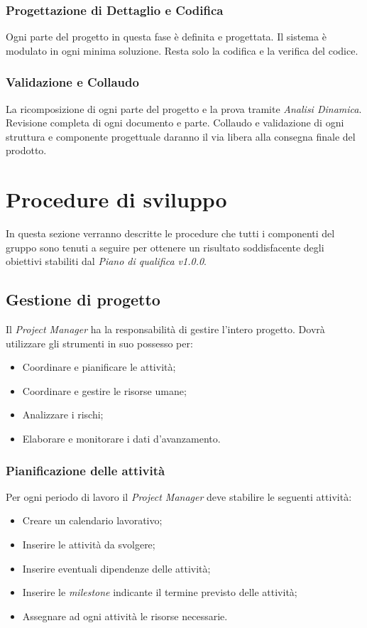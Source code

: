 \documentclass[12pt,a4paper,titlepage]{article}
\begin{document}
\subsubsection{Progettazione di Dettaglio e Codifica}
Ogni parte del progetto in questa fase è definita e progettata. Il sistema è modulato in ogni minima soluzione. Resta solo la codifica e la verifica del codice.

\subsubsection{Validazione e Collaudo}
La ricomposizione di ogni parte del progetto e la prova tramite \textit{Analisi Dinamica}. Revisione completa di ogni documento e parte. Collaudo e validazione di ogni struttura e componente progettuale daranno il via libera alla consegna finale del prodotto.

\newpage

\section{Procedure di sviluppo}
In questa sezione verranno descritte le procedure che tutti i componenti del gruppo sono tenuti a seguire
per ottenere un risultato soddisfacente degli obiettivi stabiliti dal \textit{Piano di qualifica v1.0.0}.

\subsection{Gestione di progetto}
Il \textit{Project Manager} ha la responsabilità di gestire l'intero progetto. Dovrà utilizzare gli
strumenti in suo possesso per:
\begin{itemize}
	\item Coordinare e pianificare le attività;
	\item Coordinare e gestire le risorse umane;
	\item Analizzare i rischi;
	\item Elaborare e monitorare i dati d'avanzamento.
\end{itemize}

\subsubsection{Pianificazione delle attività}
Per ogni periodo di lavoro il \textit{Project Manager} deve stabilire le seguenti attività:
\begin{itemize}
	\item Creare un calendario lavorativo;
	\item Inserire le attività da svolgere;
	\item Inserire eventuali dipendenze delle attività;
	\item Inserire le \textit{milestone} indicante il termine previsto delle attività;
	\item Assegnare ad ogni attività le risorse necessarie.
\end{itemize}
\end{document}
